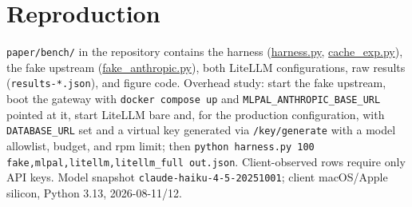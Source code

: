 \documentclass[10pt]{article}
\begin{document}
\appendix
\section{Reproduction}
\texttt{paper/bench/} in the repository contains the harness (\url{harness.py}, \url{cache_exp.py}), the fake upstream (\url{fake_anthropic.py}), both LiteLLM configurations, raw results (\texttt{results-*.json}), and figure code. Overhead study: start the fake upstream, boot the gateway with \texttt{docker compose up} and \texttt{MLPAL\_ANTHROPIC\_BASE\_URL} pointed at it, start LiteLLM bare and, for the production configuration, with \texttt{DATABASE\_URL} set and a virtual key generated via \texttt{/key/generate} with a model allowlist, budget, and rpm limit; then \texttt{python harness.py 100 fake,mlpal,litellm,litellm\_full out.json}. Client-observed rows require only API keys. Model snapshot \texttt{claude-haiku-4-5-20251001}; client macOS/Apple silicon, Python 3.13, 2026-08-11/12.
\end{document}

